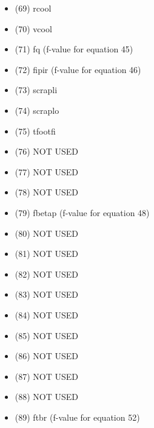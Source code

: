 \documentclass[]{article}
\begin{document}
\begin{itemize}
\begin{itemize}
    (68) fptemp (f-value for equation 44)
  \item
    (69) rcool
  \item
    (70) vcool
  \item
    (71) fq (f-value for equation 45)
  \item
    (72) fipir (f-value for equation 46)
  \item
    (73) scrapli
  \item
    (74) scraplo
  \item
    (75) tfootfi
  \item
    (76) NOT USED
  \item
    (77) NOT USED
  \item
    (78) NOT USED
  \item
    (79) fbetap (f-value for equation 48)
  \item
    (80) NOT USED
  \item
    (81) NOT USED
  \item
    (82) NOT USED
  \item
    (83) NOT USED
  \item
    (84) NOT USED
  \item
    (85) NOT USED
  \item
    (86) NOT USED
  \item
    (87) NOT USED
  \item
    (88) NOT USED
  \item
    (89) ftbr (f-value for equation 52)
  \item
    (90) blbuith
  \item
    (91) blbuoth
  \item
    (92) fflutf (f-value for equation 53)
  \item
    (93) shldith
  \item
    (94) shldoth
  \item
    (95) fptfnuc (f-value for equation 54)
  \item
    (96) fvvhe (f-value for equation 55)
  \item
    (97) fpsepr (f-value for equation 56)
  \item
    (98) li6enrich
  \item
    (99) NOT USED
  \item
    (100) NOT USED
  \item
    (101) NOT USED
  \item
    (102) fimpvar
  \item
    (103) flhthresh (f-value for equation 15)
  \item

\end{itemize}
\end{itemize}
\end{document}
